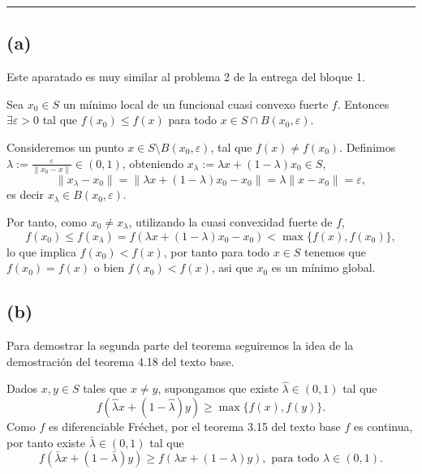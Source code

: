 \noindent\rule{10cm}{0.4pt}

\subsection*{(a)}

Este aparatado es muy similar al problema 2 de la entrega del bloque 1.

Sea $x_0 \in S$ un mínimo local de un funcional cuasi convexo fuerte $f$.
Entonces $\exists \varepsilon > 0$ tal que $f(x_0) \leq f(x)$ para todo $x \in S \cap B(x_0, \varepsilon)$.

Consideremos un punto $x \in S \setminus B(x_0, \varepsilon)$, tal que $f(x) \neq f(x_0)$.
Definimos $\lambda := \frac{\varepsilon}{\| x_0 - x \|} \in (0, 1)$,
obteniendo $x_\lambda := \lambda x + (1 - \lambda) x_0 \in S$,
\begin{equation*}
    \| x_\lambda - x_0 \| = \| \lambda x + (1 - \lambda) x_0 - x_0 \| = \lambda \| x - x_0 \| = \varepsilon,
\end{equation*}
es decir $x_\lambda \in B(x_0, \varepsilon)$.

Por tanto, como $x_0 \neq x_\lambda$, utilizando la cuasi convexidad fuerte de $f$,
\begin{equation*}
    f(x_0) \leq f(x_\lambda) = f(\lambda x + (1 - \lambda) x_0 - x_0) < \max \{ f(x), f(x_0) \},
\end{equation*}
lo que implica $f(x_0) < f(x)$, por tanto para todo $x \in S$ tenemos que $f(x_0) = f(x)$ o bien $f(x_0) < f(x)$,
asi que $x_0$ es un mínimo global.


\subsection*{(b)}

Para demostrar la segunda parte del teorema seguiremos la idea de la demostración del teorema 4.18 del texto base.

Dados $x, y \in S$ tales que $x \neq y$,
supongamos que existe $\hat{\lambda} \in (0, 1)$ tal que
\begin{equation*}
    f(\hat{\lambda} x + (1 - \hat{\lambda}) y) \geq \max \{ f(x), f(y) \}.
\end{equation*}
Como $f$ es diferenciable Fréchet,
por el teorema 3.15 del texto base $f$ es continua,
por tanto existe $\bar{\lambda} \in (0, 1)$ tal que
\begin{equation*}
    f(\bar{\lambda} x + (1 - \bar{\lambda}) y) \geq f(\lambda x + (1 - \lambda) y), \text{ para todo } \lambda \in (0, 1).
\end{equation*}

